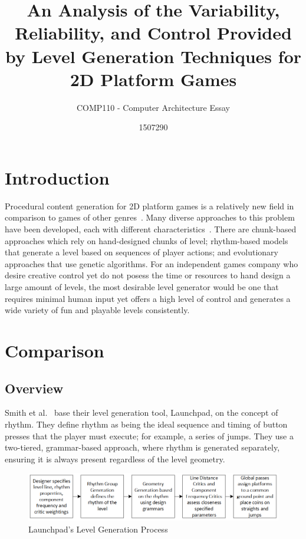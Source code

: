 \documentclass{scrartcl}
\title{An Analysis of the Variability, Reliability, and Control Provided by Level Generation Techniques for 2D Platform Games}
\subtitle{COMP110 - Computer Architecture Essay}
\author{1507290}
\begin{document}
\maketitle


\section{Introduction}
Procedural content generation for 2D platform games is a relatively new field in comparison to games of other genres~\cite{compton:platform}. Many diverse approaches to this problem have been developed, each with different characteristics~\cite{horn:comparative}. There are chunk-based approaches which rely on hand-designed chunks of level; rhythm-based models that generate a level based on sequences of player actions; and evolutionary approaches that use genetic algorithms. For an independent games company who desire creative control yet do not posess the time or resources to hand design a large amount of levels, the most desirable level generator would be one that requires minimal human input yet offers a high level of control and generates a wide variety of fun and playable levels consistently. 

\section{Comparison}

\subsection{Overview}
Smith et al.~\cite{smith:launchpad} base their level generation tool, Launchpad, on the concept of rhythm. They define rhythm as being the ideal sequence and timing of button presses that the player must execute; for example, a series of jumps. They use a two-tiered, grammar-based approach, where rhythm is generated separately, ensuring it is always present regardless of the level geometry.
\begin{figure}[h]
\includegraphics[width=\textwidth]{figs/launchpad.png}
\caption{Launchpad's Level Generation Process}
\end{figure}
\end{document}
